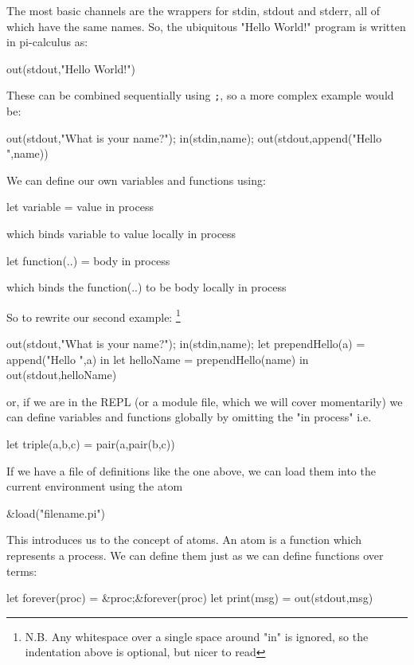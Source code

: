 The most basic channels are the wrappers for stdin, stdout and stderr, all of which have the same names. So, the ubiquitous "Hello World!" program is written in pi-calculus as:
\begin{code}
    out(stdout,"Hello World!")
\end{code}

These can be combined sequentially using \verb!;!, so a more complex example would be:
\begin{code}
    out(stdout,"What is your name?");
    in(stdin,name);
    out(stdout,append("Hello ",name))
\end{code}

We can define our own variables and functions using:
\begin{code}
    let variable = value in process
\end{code}
which binds variable to value locally in process

\begin{code}
    let function(..) = body in process 
\end{code}
which binds the function(..) to be body locally in process

So to rewrite our second example: \footnote{N.B. Any whitespace over a single space around "in" is ignored, so the indentation above is optional, but nicer to read}
\begin{code}
    out(stdout,"What is your name?");
    in(stdin,name);
    let prependHello(a) = append("Hello ",a) in
        let helloName = prependHello(name) in
            out(stdout,helloName)
\end{code}


or, if we are in the REPL (or a module file, which we will cover momentarily) we can define variables and functions globally by omitting the "in process"
i.e.
\begin{code}
    let triple(a,b,c) = pair(a,pair(b,c))
\end{code}


If we have a file of definitions like the one above, we can load them into the current environment using the atom 
\begin{code}
    &load("filename.pi")
\end{code}

This introduces us to the concept of atoms. An atom is a function which represents a process. We can define them just as we can define functions over terms:
\begin{code}
    let forever(proc) = &proc;&forever(proc)
    let print(msg)    = out(stdout,msg)     
\end{code}

